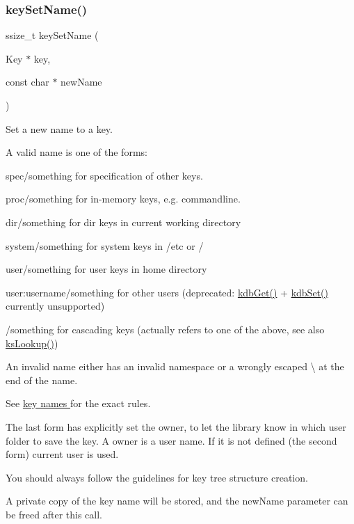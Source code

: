 \subsubsection{\texorpdfstring{key\+Set\+Name()}{keySetName()}}
{\footnotesize\ttfamily ssize\+\_\+t key\+Set\+Name (\begin{DoxyParamCaption}\item[{Key $\ast$}]{key,  }\item[{const char $\ast$}]{new\+Name }\end{DoxyParamCaption})}



Set a new name to a key. 

A valid name is one of the forms\+:
\begin{DoxyItemize}
\item {\ttfamily spec/something} for specification of other keys.
\item {\ttfamily proc/something} for in-\/memory keys, e.\+g. commandline.
\item {\ttfamily dir/something} for dir keys in current working directory
\item {\ttfamily system/something} for system keys in /etc or /
\item {\ttfamily user/something} for user keys in home directory
\item {\ttfamily user\+:username/something} for other users (deprecated\+: \hyperlink{group__kdb_ga28e385fd9cb7ccfe0b2f1ed2f62453a1}{kdb\+Get()} + \hyperlink{group__kdb_ga11436b058408f83d303ca5e996832bcf}{kdb\+Set()} currently unsupported)
\item {\ttfamily /something} for cascading keys (actually refers to one of the above, see also \hyperlink{group__keyset_gaa34fc43a081e6b01e4120daa6c112004}{ks\+Lookup()})
\end{DoxyItemize}

An invalid name either has an invalid namespace or a wrongly escaped \textbackslash{} at the end of the name.

See \hyperlink{group__keyname}{key names } for the exact rules.

The last form has explicitly set the owner, to let the library know in which user folder to save the key. A owner is a user name. If it is not defined (the second form) current user is used.

You should always follow the guidelines for key tree structure creation.

A private copy of the key name will be stored, and the {\ttfamily new\+Name} parameter can be freed after this call.

